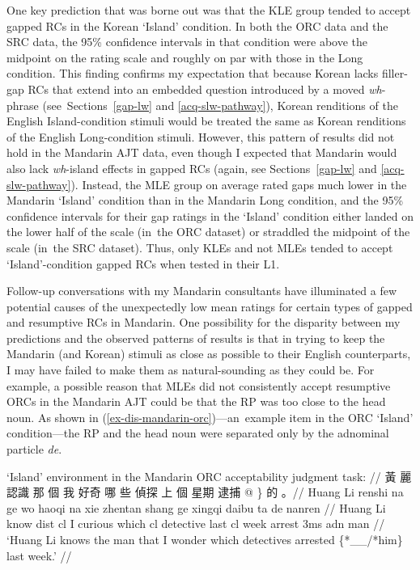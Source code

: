 
One key prediction that was borne out was that the KLE group tended to accept gapped RCs in the Korean `Island' condition. In both the ORC data and the SRC data, the 95\% confidence intervals in that condition were above the midpoint on the rating scale and roughly on par with those in the Long condition. This finding confirms my expectation that because Korean lacks filler-gap RCs that extend into an embedded question introduced by a moved \textit{wh}-phrase (see~Sections~\ref{gap-lw} and \ref{acq-slw-pathway}), Korean renditions of the English Island-condition stimuli would be treated the same as Korean renditions of the English Long-condition stimuli. However, this pattern of results did not hold in the Mandarin AJT data, even though I expected that Mandarin would also lack \textit{wh}-island effects in gapped RCs (again, see Sections~\ref{gap-lw} and \ref{acq-slw-pathway}). Instead, the MLE group on average rated gaps much lower in the Mandarin `Island' condition than in the Mandarin Long condition, and the 95\% confidence intervals for their gap ratings in the `Island' condition either landed on the lower half of the scale (in~the ORC dataset) or straddled the midpoint of the scale (in~the SRC dataset). Thus, only KLEs and not MLEs tended to accept `Island'-condition gapped RCs when tested in their L1. 

Follow-up conversations with my Mandarin consultants have illuminated a few potential causes of the unexpectedly low mean ratings for certain types of gapped and resumptive RCs in Mandarin. One possibility for the disparity between my predictions and the observed patterns of results is that in trying to keep the Mandarin (and Korean) stimuli as close as possible to their English counterparts, I may have failed to make them as natural-sounding as they could be. For example, a possible reason that MLEs did not consistently accept resumptive ORCs in the Mandarin AJT could be that the RP was too close to the head noun. As shown in (\ref{ex-dis-mandarin-orc})---an~example item in the ORC `Island' condition---the RP and the head noun were separated only by the adnominal particle \textit{de}.

\ex[everygla=\zh]
\begingl
\glpreamble `Island' environment in the Mandarin ORC acceptability judgment task: // \label{ex-dis-mandarin-orc}
\gla 黃 麗 認識 那 個 我 好奇 哪 些 偵探 上 個 星期 逮捕 \nogloss{\{\_\_/} @ \} 的 。// 
\glb Huang Li renshi na ge wo haoqi na xie zhentan shang ge xingqi daibu ta de nanren //
\glc Huang Li know {\sc dist} {\sc cl} I curious which {\sc cl} detective last {\sc cl} week arrest {\sc 3ms} {\sc adn} man //
\glft `Huang Li knows the man that I wonder which detectives arrested \{*\_\_/*him\} last week.' //
\endgl 
\xe

